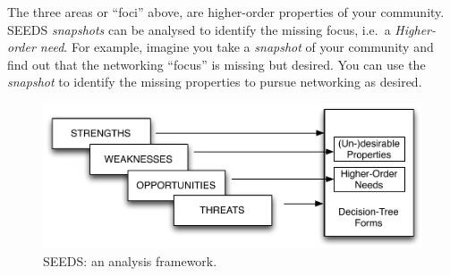 The three areas or ``foci'' above, are higher-order properties of your community. SEEDS \emph{\emph{snapshots}} can be analysed to identify the missing focus, i.e.~a \emph{Higher-order need}. For example, imagine you take a \emph{snapshot} of your community and find out that the networking ``focus'' is missing but desired. You can use the \emph{snapshot} to identify the missing properties to pursue networking as desired.

\begin{figure}[h!]
    \includegraphics[width=4.5in]{fw.pdf}    %
\caption{\footnotesize SEEDS: an analysis framework.}\label{fwpic}
\end{figure}



%
